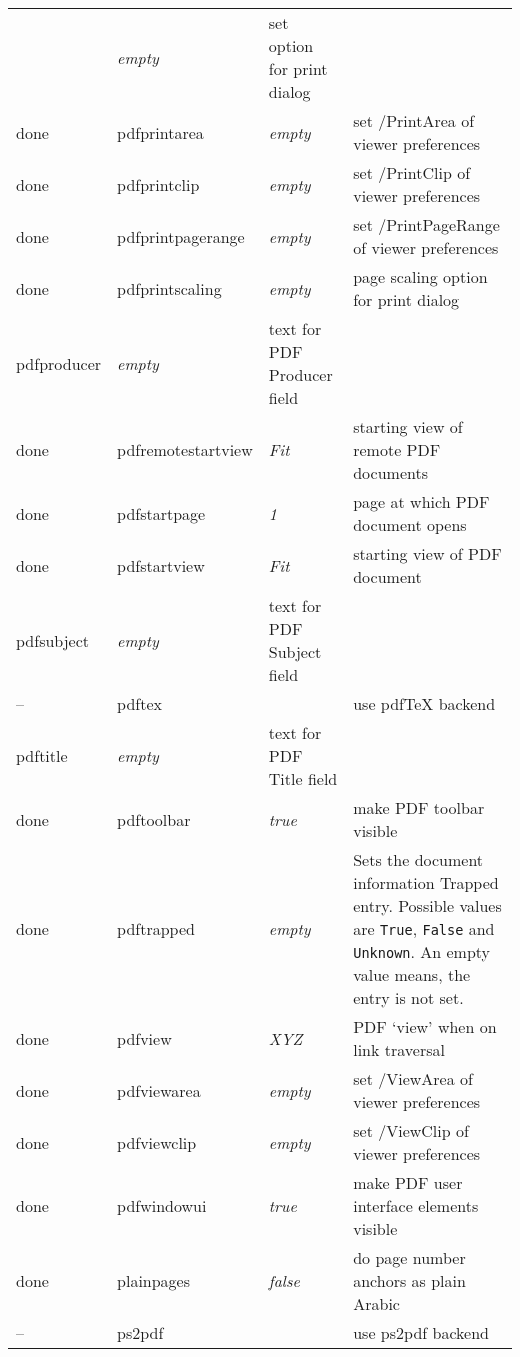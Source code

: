 \begin{longtable}{@{}l>{\ttfamily}llp{7cm}@{}}
                   & \textit{empty}         & set option for print dialog \\
done &pdfprintarea       & \textit{empty}         & set /PrintArea of viewer preferences \\
done &pdfprintclip       & \textit{empty}         & set /PrintClip of viewer preferences \\
done & pdfprintpagerange  & \textit{empty}         & set /PrintPageRange of viewer preferences \\
done & pdfprintscaling    & \textit{empty}         & page scaling option for print dialog \\
pdfproducer        & \textit{empty}         & text for PDF Producer field \\
done & pdfremotestartview & \textit{Fit}           & starting view of remote PDF documents \\
done & pdfstartpage       & \textit{1}             & page at which PDF document opens \\
done & pdfstartview       & \textit{Fit}           & starting view of PDF document \\
pdfsubject         & \textit{empty}         & text for PDF Subject field \\
-- & pdftex             &                        & use \textsf{pdf\TeX} backend \\
pdftitle           & \textit{empty}         & text for PDF Title field \\
done &pdftoolbar         & \textit{true}          & make PDF toolbar visible \\
done & pdftrapped         & \textit{empty} & Sets the document information Trapped entry.
  Possible values are \texttt{True}, \texttt{False} and \texttt{Unknown}.
  An empty value means, the entry is not set.\\
done & pdfview            & \textit{XYZ}           & PDF `view' when on link traversal \\
done & pdfviewarea        & \textit{empty}         & set /ViewArea of viewer preferences \\
done & pdfviewclip        & \textit{empty}         & set /ViewClip of viewer preferences \\
done & pdfwindowui        & \textit{true}          & make PDF user interface elements visible \\
done & plainpages         & \textit{false}         & do page number anchors as plain Arabic \\
-- & ps2pdf             &                        & use \textsf{ps2pdf} backend \\

\end{longtable}
